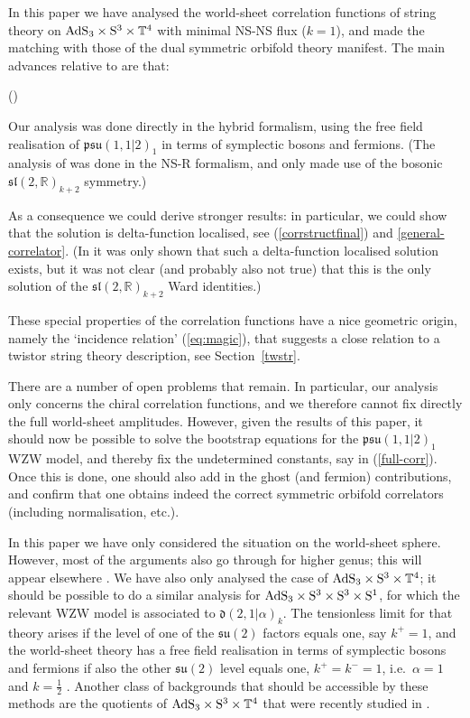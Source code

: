 \documentclass[a4paper,11pt]{article}
\numberwithin{equation}{section}
\begin{document}
In this paper we have analysed the world-sheet correlation functions of string theory on ${\rm AdS}_3 \times {\rm S}^3 \times \mathbb{T}^4$ with minimal NS-NS flux ($k=1$), and made the matching with those of the dual symmetric orbifold theory manifest. The main advances relative to \cite{Eberhardt:2019ywk} are that:
\begin{list}{()}{}
\item Our analysis was  done directly in the hybrid formalism, using the free field realisation of $\mathfrak{psu}(1,1|2)_1$ in terms of symplectic bosons and fermions. (The analysis of \cite{Eberhardt:2019ywk} was done in the NS-R formalism, and only made use of the bosonic $\mathfrak{sl}(2,\mathds{R})_{k+2}$ symmetry.)
\item As a consequence we could derive stronger results: in particular, we could show that the solution is delta-function localised, see (\ref{corrstructfinal}) and \eqref{general-correlator}. (In \cite{Eberhardt:2019ywk} it was only shown that such a delta-function localised solution exists, but it was not clear (and probably also not true) that this is the only solution of the $\mathfrak{sl}(2,\mathds{R})_{k+2}$ Ward identities.)
\item These special properties of the correlation functions have a nice geometric origin, namely the `incidence relation' (\ref{eq:magic}), that suggests a close relation to a twistor string theory description, see Section~\ref{twstr}.
\end{list}
There are a number of open problems that remain. In particular, our analysis only concerns the chiral correlation functions, and we therefore cannot fix directly the full world-sheet amplitudes. However, given the results of this paper, it should now be possible to solve the bootstrap equations for the $\mathfrak{psu}(1,1|2)_1$ WZW model, and thereby fix the undetermined constants, say in (\ref{full-corr}). Once this is done, one should also add in the ghost (and fermion) contributions, and confirm that one obtains indeed the correct symmetric orbifold correlators (including normalisation, etc.). 

In this paper we have only considered the situation on the world-sheet sphere. However, most of the arguments also go through for higher genus; this will appear elsewhere \cite{Bob}. We have also only analysed the case of ${\rm AdS}_3 \times {\rm S}^3 \times \mathbb{T}^4$; it should be possible to do a similar analysis for ${\rm AdS}_3 \times {\rm S}^3 \times {\rm S}^3 \times {\rm S}^1$, for which the relevant WZW model is associated to $\mathfrak{d}(2,1|\alpha)_k$. The tensionless limit for that theory arises if the level of one of the $\mathfrak{su}(2)$ factors equals one, say $k^+=1$, and the world-sheet theory has a free field realisation in terms of symplectic bosons and fermions if also the other $\mathfrak{su}(2)$ level equals one, $k^+=k^-=1$, i.e.\ $\alpha=1$ and $k=\frac{1}{2}$ \cite{Eberhardt:2019niq}. Another class of backgrounds that should be accessible by these methods are the quotients of ${\rm AdS}_3 \times {\rm S}^3 \times \mathbb{T}^4$ that were recently studied in \cite{Eberhardt:2020bgq}.
\end{document}
